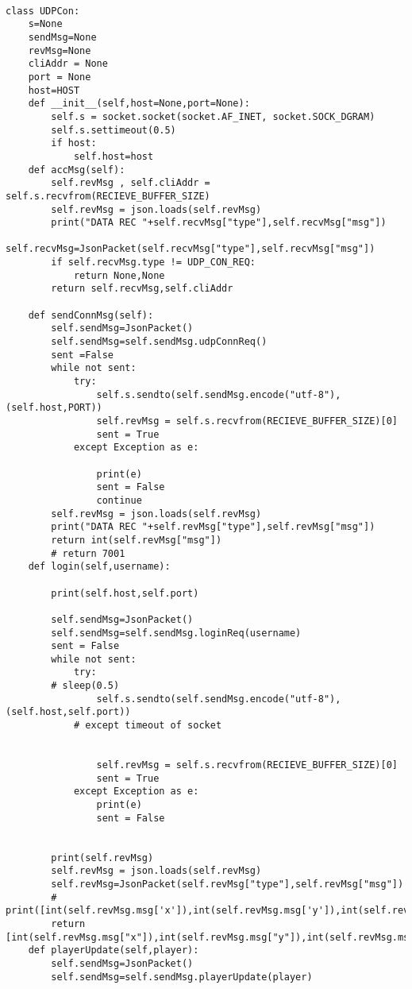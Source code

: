        \begin{lstlisting}[style=pythonstyle, caption=client communication classes]

class UDPCon:
    s=None
    sendMsg=None
    revMsg=None
    cliAddr = None
    port = None
    host=HOST
    def __init__(self,host=None,port=None):
        self.s = socket.socket(socket.AF_INET, socket.SOCK_DGRAM)
        self.s.settimeout(0.5)
        if host:
            self.host=host
    def accMsg(self):
        self.revMsg , self.cliAddr = self.s.recvfrom(RECIEVE_BUFFER_SIZE)
        self.revMsg = json.loads(self.revMsg)
        print("DATA REC "+self.recvMsg["type"],self.recvMsg["msg"])
        self.recvMsg=JsonPacket(self.recvMsg["type"],self.recvMsg["msg"])
        if self.recvMsg.type != UDP_CON_REQ:
            return None,None
        return self.recvMsg,self.cliAddr

    def sendConnMsg(self):
        self.sendMsg=JsonPacket()
        self.sendMsg=self.sendMsg.udpConnReq()
        sent =False
        while not sent:
            try:
                self.s.sendto(self.sendMsg.encode("utf-8"), (self.host,PORT))
                self.revMsg = self.s.recvfrom(RECIEVE_BUFFER_SIZE)[0]
                sent = True
            except Exception as e:

                print(e)
                sent = False
                continue
        self.revMsg = json.loads(self.revMsg)
        print("DATA REC "+self.revMsg["type"],self.revMsg["msg"])
        return int(self.revMsg["msg"])
        # return 7001
    def login(self,username):
        
        print(self.host,self.port)

        self.sendMsg=JsonPacket()
        self.sendMsg=self.sendMsg.loginReq(username)
        sent = False
        while not sent:
            try:
        # sleep(0.5)
                self.s.sendto(self.sendMsg.encode("utf-8"), (self.host,self.port))
            # except timeout of socket
                
        
                self.revMsg = self.s.recvfrom(RECIEVE_BUFFER_SIZE)[0]
                sent = True
            except Exception as e:
                print(e)
                sent = False


        print(self.revMsg)
        self.revMsg = json.loads(self.revMsg)
        self.revMsg=JsonPacket(self.revMsg["type"],self.revMsg["msg"])
        # print([int(self.revMsg.msg['x']),int(self.revMsg.msg['y']),int(self.revMsg.msg['id'])])
        return [int(self.revMsg.msg["x"]),int(self.revMsg.msg["y"]),int(self.revMsg.msg["id"])]
    def playerUpdate(self,player):
        self.sendMsg=JsonPacket()
        self.sendMsg=self.sendMsg.playerUpdate(player)


\end{lstlisting}
